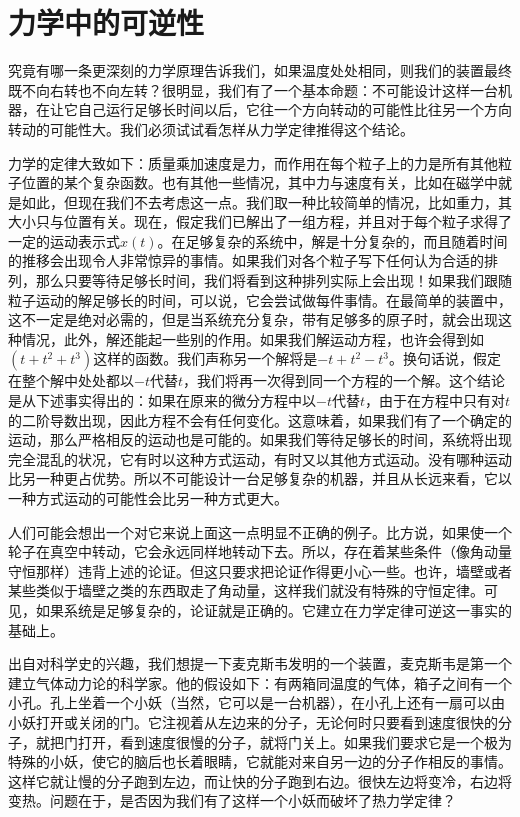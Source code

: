 \section{力学中的可逆性}

究竟有哪一条更深刻的力学原理告诉我们，如果温度处处相同，则我们的装置最终既不向右转也不向左转？很明显，我们有了一个基本命题：不可能设计这样一台机器，在让它自己运行足够长时间以后，它往一个方向转动的可能性比往另一个方向转动的可能性大。我们必须试试看怎样从力学定律推得这个结论。

力学的定律大致如下：质量乘加速度是力，而作用在每个粒子上的力是所有其他粒子位置的某个复杂函数。也有其他一些情况，其中力与速度有关，比如在磁学中就是如此，但现在我们不去考虑这一点。我们取一种比较简单的情况，比如重力，其大小只与位置有关。现在，假定我们已解出了一组方程，并且对于每个粒子求得了一定的运动表示式$x(t)$。在足够复杂的系统中，解是十分复杂的，而且随着时间的推移会出现令人非常惊异的事情。如果我们对各个粒子写下任何认为合适的排列，那么只要等待足够长时间，我们将看到这种排列实际上会出现！如果我们跟随粒子运动的解足够长的时间，可以说，它会尝试做每件事情。在最简单的装置中，这不一定是绝对必需的，但是当系统充分复杂，带有足够多的原子时，就会出现这种情况，此外，解还能起一些别的作用。如果我们解运动方程，也许会得到如$(t +t^2 +t^3)$这样的函数。我们声称另一个解将是$-t +t^2 -t^3$。换句话说，假定在整个解中处处都以$-t$代替$t$，我们将再一次得到同一个方程的一个解。这个结论是从下述事实得出的：如果在原来的微分方程中以$-t$代替$t$，由于在方程中只有对$t$的二阶导数出现，因此方程不会有任何变化。这意味着，如果我们有了一个确定的运动，那么严格相反的运动也是可能的。如果我们等待足够长的时间，系统将出现完全混乱的状况，它有时以这种方式运动，有时又以其他方式运动。没有哪种运动比另一种更占优势。所以不可能设计一台足够复杂的机器，并且从长远来看，它以一种方式运动的可能性会比另一种方式更大。

人们可能会想出一个对它来说上面这一点明显不正确的例子。比方说，如果使一个轮子在真空中转动，它会永远同样地转动下去。所以，存在着某些条件（像角动量守恒那样）违背上述的论证。但这只要求把论证作得更小心一些。也许，墙壁或者某些类似于墙壁之类的东西取走了角动量，这样我们就没有特殊的守恒定律。可见，如果系统是足够复杂的，论证就是正确的。它建立在力学定律可逆这一事实的基础上。

出自对科学史的兴趣，我们想提一下麦克斯韦发明的一个装置，麦克斯韦是第一个建立气体动力论的科学家。他的假设如下：有两箱同温度的气体，箱子之间有一个小孔。孔上坐着一个小妖（当然，它可以是一台机器），在小孔上还有一扇可以由小妖打开或关闭的门。它注视着从左边来的分子，无论何时只要看到速度很快的分子，就把门打开，看到速度很慢的分子，就将门关上。如果我们要求它是一个极为特殊的小妖，使它的脑后也长着眼睛，它就能对来自另一边的分子作相反的事情。这样它就让慢的分子跑到左边，而让快的分子跑到右边。很快左边将变冷，右边将变热。问题在于，是否因为我们有了这样一个小妖而破坏了热力学定律？

